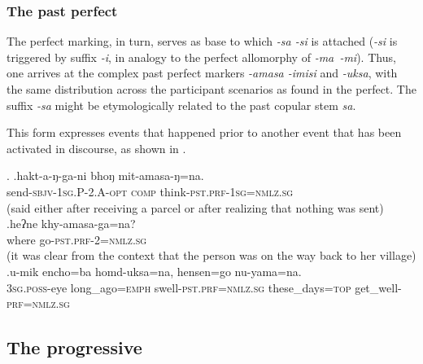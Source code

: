 	
\subsubsection{The past perfect}\label{pstprf}
	
The perfect marking, in turn, serves as base to which \emph{-sa \ti -si} is attached (\emph{-si} is triggered by suffix \emph{-i}, in analogy to the perfect allomorphy of \mbox{\emph{-ma \ti -mi}}). Thus, one arrives at the complex past perfect markers \emph{-amasa \ti -imisi} and  \emph{-uksa}, with the same distribution across the participant scenarios as found in the perfect. The suffix \emph{-sa} might be etymologically related to the past copular stem \emph{sa}. 

This  form expresses events that happened prior to another event that has been activated in discourse, as shown in \Next.

\ex. \ag.hakt-a-ŋ-ga-ni bhoŋ mit-amasa-ŋ=na.\\
send{\scshape -sbjv-1sg.P-2.A-opt} {\scshape comp} think{\scshape -pst.prf-1sg=nmlz.sg}\\
 (said \mbox{either} after receiving a parcel or after realizing that nothing was sent)
\bg.heʔne khy-amasa-ga=na?\\
where go{\scshape -pst.prf-2=nmlz.sg}\\
 (it was clear from the context that the person was on the way back to her village) 
	\bg.u-mik encho=ba homd-uksa=na, hensen=go nu-yama=na.\\
		{\scshape 3sg.poss-}eye long\_ago{\scshape =emph} swell{\scshape -pst.prf=nmlz.sg} these\_days{\scshape =top} get\_well{\scshape -prf=nmlz.sg}\\
		
		
\subsection{The  progressive}\label{progressive}


